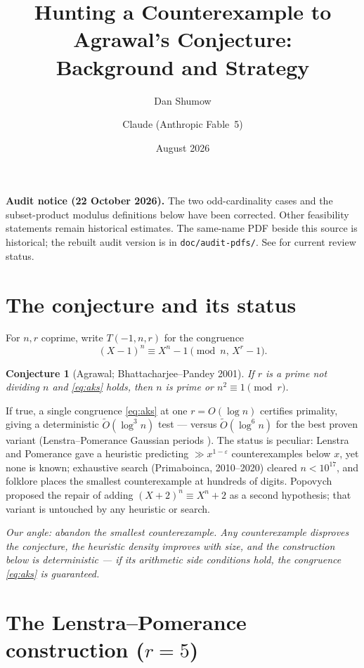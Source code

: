 \documentclass[10pt]{article}
\title{Hunting a Counterexample to Agrawal's Conjecture:\\Background and Strategy}
\author{Dan Shumow \and Claude (Anthropic Fable~5)}
\date{August 2026}
\newtheorem{conjecture}{Conjecture}
\begin{document}
\maketitle
\vspace{-2.5em}

\noindent\textbf{Audit notice (22 October 2026).}
The two odd-cardinality cases and the subset-product modulus definitions below
have been corrected. Other feasibility statements remain historical estimates.
The same-name PDF beside this source is historical; the rebuilt audit version
is in \texttt{doc/audit-pdfs/}. See 
for current review status.

\section{The conjecture and its status}

For $n,r$ coprime, write $T(-1,n,r)$ for the congruence
\begin{equation}\label{eq:aks}
(X-1)^n \equiv X^n - 1 \pmod{n,\, X^r-1}.
\end{equation}

\begin{conjecture}[Agrawal; Bhattacharjee--Pandey 2001]\label{conj:agrawal}
If $r$ is a prime not dividing $n$ and \eqref{eq:aks} holds, then $n$ is prime or
$n^2 \equiv 1 \pmod r$.
\end{conjecture}

If true, a single congruence \eqref{eq:aks} at one $r = O(\log n)$ certifies
primality, giving a deterministic $\tilde O(\log^3 n)$ test --- versus
$\tilde O(\log^6 n)$ for the best proven variant (Lenstra--Pomerance Gaussian
periods \cite{LP2019}). The status is peculiar: Lenstra and Pomerance
\cite{LPremarks} gave a heuristic predicting $\gg x^{1-\varepsilon}$
counterexamples below $x$, yet none is known; exhaustive search
(Primaboinca, 2010--2020) cleared $n < 10^{17}$, and folklore places the smallest
counterexample at hundreds of digits. Popovych \cite{Popovych09} proposed the
repair of adding $(X+2)^n \equiv X^n+2$ as a second hypothesis; that variant is
untouched by any heuristic or search.

\emph{Our angle: abandon the smallest counterexample. Any counterexample
disproves the conjecture, the heuristic density improves with size, and the
construction below is deterministic --- if its arithmetic side conditions hold,
the congruence \eqref{eq:aks} is guaranteed.}

\section{The Lenstra--Pomerance construction ($r=5$)}
\end{document}

